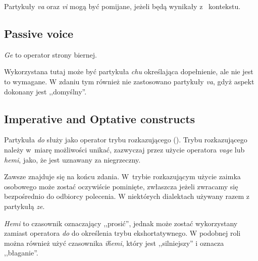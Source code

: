 
Partykuły \emph{va} oraz \emph{vi} mogą być pomijane, jeżeli będą wynikały z~
kontekstu.

\subsection{Passive voice}

\emph{Ge} to operator strony biernej.


Wykorzystana tutaj może być partykuła \emph{chu} określająca dopełnienie, ale
nie jest to wymagane. W zdaniu tym również nie zastosowano partykuły \emph{va},
gdyż aspekt dokonany jest ,,domyślny''.

\subsection{Imperative and Optative constructs}

Partykuła \emph{do} służy jako operator trybu rozkazującego (\Imp{}). Trybu
rozkazującego należy w~miarę możliwości unikać, zazwyczaj przez użycie operatora
\emph{vage} lub \emph{hemi}, jako, że jest uznawany za niegrzeczny.

Zawsze znajduje się na końcu zdania. W~trybie rozkazującym użycie zaimka
osobowego może zostać oczywiście pominięte, zwłaszcza jeżeli zwracamy się
bezpośrednio do odbiorcy polecenia. W niektórych dialektach używany razem z
partykułą \emph{ze}.



\emph{Hemi} to czasownik oznaczający ,,prosić'', jednak może zostać wykorzystany
zamiast operatora \emph{do} do określenia trybu ekshortatywnego. W podobnej roli
można również użyć czasownika \emph{ih́emi}, który jest ,,silniejszy'' i oznacza
,,błaganie''.


